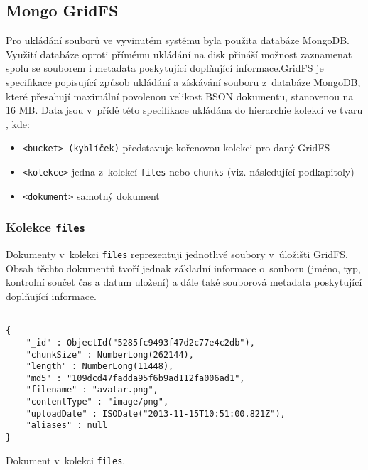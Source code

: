 \subsection{Mongo GridFS}
Pro ukládání souborů ve vyvinutém systému byla použita databáze MongoDB. Využití databáze oproti přímému ukládání na disk přináší možnost zaznamenat spolu se souborem i metadata poskytující doplňující informace.GridFS je specifikace popisující způsob ukládání a získávání souboru z~databáze MongoDB, které přesahují maximální povolenou velikost BSON dokumentu, stanovenou na 16 MB. Data jsou v~přídě této specifikace ukládána do hierarchie kolekcí ve tvaru , kde:
\begin{itemize}
\item \texttt{<bucket> (kyblíček)} představuje kořenovou kolekci pro daný GridFS
\item \texttt{<kolekce>} jedna z~kolekcí \texttt{files} nebo \texttt{chunks} (viz. následující podkapitoly)
\item \texttt{<dokument>} samotný dokument
\end{itemize}

\subsubsection{\textbf{Kolekce \texttt{files}}}
Dokumenty v~kolekci \texttt{files} reprezentuji jednotlivé soubory v~úložišti GridFS. Obsah těchto dokumentů tvoří jednak základní informace o~souboru (jméno, typ, kontrolní součet čas a datum uložení) a dále také souborová metadata poskytující doplňující informace.
\begin{example}
    \centering
    \begin{lstlisting}

{
    "_id" : ObjectId("5285fc9493f47d2c77e4c2db"),
    "chunkSize" : NumberLong(262144),
    "length" : NumberLong(11448),
    "md5" : "109dcd47fadda95f6b9ad112fa006ad1",
    "filename" : "avatar.png",
    "contentType" : "image/png",
    "uploadDate" : ISODate("2013-11-15T10:51:00.821Z"),
    "aliases" : null
}
    \end{lstlisting}
    \caption{Dokument v~kolekci \texttt{files}.}
\end{example}

